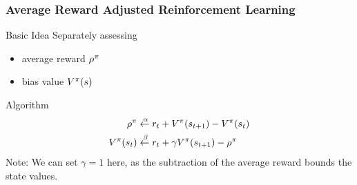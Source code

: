 \documentclass[xcolor=table%
,t]{beamer}
\begin{document}
\begin{frame}[t]
  \frametitle{Average Reward Adjusted Reinforcement Learning~\footnotemark[4]}

  \begin{block}{Basic Idea}
    Separately assessing
    \begin{itemize}
    \item average reward \(\rho^{\pi}\)
    \item bias value \(V^{\pi}(s)\)
    \end{itemize}
  \end{block}\pause

  \begin{block}{Algorithm}
    \vspace{-2ex}
    \begin{align*}
      \rho^{\pi}  & \overset{\hspace{2pt}\alpha}{\leftarrow} r_{t} + V^\pi(s_{t+1}) - V^\pi(s_{t})\\
      V^\pi(s_{t}) & \overset{\hspace{2pt}\beta}{\leftarrow} r_{t} + \gamma V^\pi(s_{t+1}) - \rho^{\pi}
    \end{align*}
    Note: We can set \(\gamma = 1\) here, as the subtraction of the average reward bounds the
    state values.
  \end{block}

\end{frame}
\end{document}
